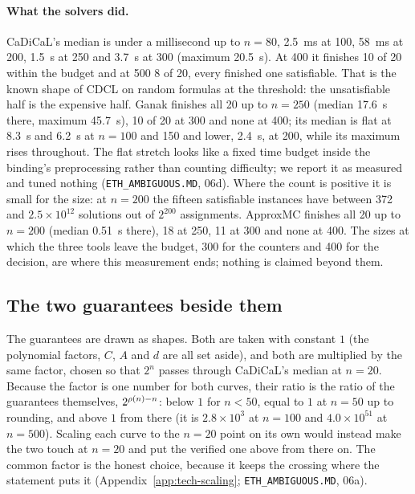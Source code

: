 \paragraph{What the solvers did.} CaDiCaL's median is under a
millisecond up to $n = 80$, 2.5~ms at 100, 58~ms at 200, 1.5~s at 250
and 3.7~s at 300 (maximum 20.5~s). At 400 it finishes 10 of 20 within
the budget and at 500 8 of 20, every finished one satisfiable. That is
the known shape of CDCL on random formulas at the threshold: the
unsatisfiable half is the expensive half. Ganak finishes all 20 up to
$n = 250$ (median 17.6~s there, maximum 45.7~s), 10 of 20 at 300 and
none at 400; its median is flat at 8.3~s and 6.2~s at $n = 100$ and
150 and lower, 2.4~s, at 200, while its maximum rises throughout. The
flat stretch looks like a fixed time budget inside the binding's
preprocessing rather than counting difficulty; we report it as measured
and tuned nothing (\texttt{ETH\_AMBIGUOUS.MD}, 06d). Where the count is
positive it is small for the size: at $n = 200$ the fifteen satisfiable
instances have between 372 and $2.5 \times 10^{12}$ solutions out of
$2^{200}$ assignments. ApproxMC finishes all 20 up to $n = 200$ (median
0.51~s there), 18 at 250, 11 at 300 and none at 400. The sizes at which
the three tools leave the budget, 300 for the counters and 400 for the
decision, are where this measurement ends; nothing is claimed beyond
them.

\subsection{The two guarantees beside them}
\label{sec:practitioner-guarantees}

The guarantees are drawn as shapes. Both are taken with constant $1$
(the polynomial factors, $C$, $A$ and $d$ are all set aside), and both
are multiplied by the same factor, chosen so that $2^n$ passes through
CaDiCaL's median at $n = 20$. Because the factor is one number for both
curves, their ratio is the ratio of the guarantees themselves,
$2^{\rho(n) - n}$: below $1$ for $n < 50$, equal to $1$ at $n = 50$ up to
rounding, and above $1$ from there (it is $2.8 \times 10^{3}$ at
$n = 100$ and $4.0 \times 10^{51}$ at $n = 500$). Scaling each curve to
the $n = 20$ point on its own would instead make the two touch at
$n = 20$ and put the verified one above from there on. The common
factor is the honest choice, because it keeps the crossing where the
statement puts it (Appendix~\ref{app:tech-scaling};
\texttt{ETH\_AMBIGUOUS.MD}, 06a).

